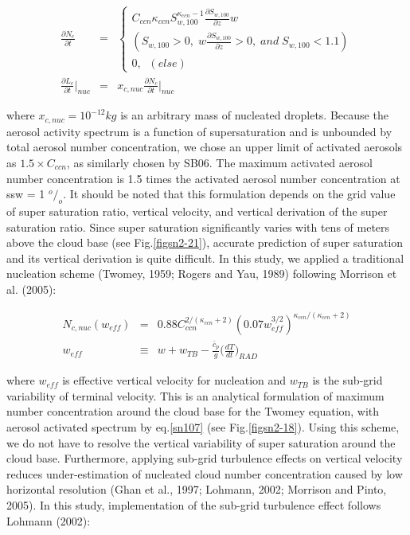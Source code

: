 \begin{eqnarray}
\frac{\partial N_{c}}{\partial t}&=&
\left\{
\begin{array}{l}
C_{ccn}\kappa_{ccn}S_{w,100}^{\kappa_{ccn}-1}\frac{\partial S_{w,100}}{\partial z}w\nonumber\\
(S_{w,100}>0,\;w\frac{\partial S_{w,100}}{\partial z}>0,\;and\;S_{w,100}<1.1) \nonumber\\
0,\;\;(else)
\end{array}
\right.\\
\label{sn108}
\frac{\partial L_{c}}{\partial t}\Bigr|_{nuc}&=&x_{c,nuc}\frac{\partial N_{c}}{\partial t}\Bigr|_{nuc}\label{sn109}
\end{eqnarray}

where $x_{c,nuc} = 10^{-12} kg$ is an arbitrary mass of nucleated droplets. Because the aerosol activity spectrum is a function of supersaturation and is unbounded by total aerosol number concentration, we chose an upper limit of activated aerosols as $1.5 \times C_{ccn}$, as similarly chosen by SB06. The maximum activated aerosol number concentration is 1.5 times the activated aerosol number concentration at ssw = 1 $^{o}/_{o}$. It should be noted that this formulation depends on the grid value of super saturation ratio, vertical velocity, and vertical derivation of the super saturation ratio. Since super saturation significantly varies with tens of meters above the cloud base (see Fig.\ref{figsn2-21}), accurate prediction of super saturation and its vertical derivation is quite difficult. In this study, we applied a traditional nucleation scheme (Twomey, 1959; Rogers and Yau, 1989) following Morrison et al. (2005):

\begin{eqnarray}
N_{c,nuc}(w_{eff})&=&0.88C_{ccn}^{2/(\kappa_{ccn}+2)}(0.07w_{eff}^{3/2})^{\kappa_{ccn}/(\kappa_{ccn}+2)}\label{sn110}\\
w_{eff}&\equiv&w+w_{TB}-\frac{\bar{c}_{p}}{g}\bigl(\frac{dT}{dt}\bigr)_{RAD}\label{sn111}
\end{eqnarray}

where $w_{eff}$ is effective vertical velocity for nucleation and $w_{TB}$ is the sub-grid variability of terminal velocity. This is an analytical formulation of maximum number concentration around the cloud base for the Twomey equation, with aerosol activated spectrum by eq.\ref{sn107} (see Fig.\ref{figsn2-18}). Using this scheme, we do not have to resolve the vertical variability of super saturation around the cloud base. Furthermore, applying sub-grid turbulence effects on vertical velocity reduces under-estimation of nucleated cloud number concentration caused by low horizontal resolution (Ghan et al., 1997; Lohmann, 2002; Morrison and Pinto, 2005). In this study, implementation of the sub-grid turbulence effect follows Lohmann (2002):

